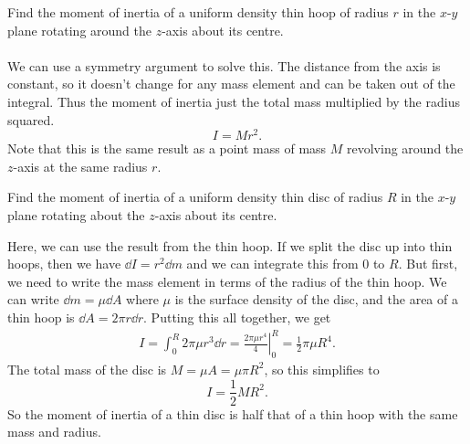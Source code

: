 \documentclass[../classical_mechanics.tex]{subfiles}
\begin{document}
        \begin{example}
            Find the moment of inertia of a uniform density thin hoop of radius $r$ in the $x$-$y$ plane rotating around the $z$-axis about its centre.
                    

            \paragraph{}
            We can use a symmetry argument to solve this.
            The distance from the axis is constant, so it doesn't change for any mass element and can be taken out of the integral.
            Thus the moment of inertia just the total mass multiplied by the radius squared.
            \begin{equation}
                I=Mr^2.
            \end{equation}
            Note that this is the same result as a point mass of mass $M$ revolving around the $z$-axis at the same radius $r$. 
        \end{example}
        \begin{example}
            Find the moment of inertia of a uniform density thin disc of radius $R$ in the $x$-$y$ plane rotating about the $z$-axis about its centre.
                    
            Here, we can use the result from the thin hoop.
            If we split the disc up into thin hoops, then we have $\dd{I}=r^2\dd{m}$ and we can integrate this from $0$ to $R$.
            But first, we need to write the mass element in terms of the radius of the thin hoop.
            We can write $\dd{m}=\mu\dd{A}$ where $\mu$ is the surface density of the disc, and the area of a thin hoop is $\dd{A}=2\pi r\dd{r}$.
            Putting this all together, we get
            \begin{align}
                I=\int_0^R 2\pi\mu r^3\dd{r}=\left.\frac{2\pi\mu r^4}{4}\right|_0^R=\frac{1}{2}\pi\mu R^4.
            \end{align}
            The total mass of the disc is $M=\mu A=\mu\pi R^2$, so this simplifies to
            \begin{equation}
                I=\frac{1}{2}MR^2.
            \end{equation}
            So the moment of inertia of a thin disc is half that of a thin hoop with the same mass and radius.
        \end{example}
\end{document}
